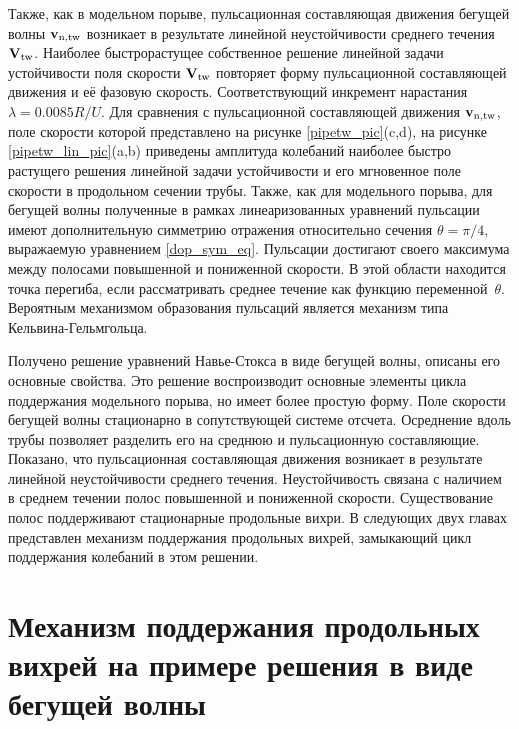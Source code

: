 Также, как в модельном порыве, пульсационная составляющая движения бегущей волны $\mathbf{v}_\mathrm{n,tw}$ возникает в результате линейной неустойчивости среднего течения $\mathbf{V}_\mathrm{tw}$. Наиболее быстрорастущее собственное решение линейной задачи устойчивости поля скорости $\mathbf{V}_\mathrm{tw}$ повторяет форму пульсационной составляющей движения и её фазовую скорость. Соответствующий инкремент нарастания $\lambda = 0.0085R/U$. Для сравнения с пульсационной составляющей движения $\mathbf{v}_\mathrm{n,tw}$, поле скорости которой представлено на рисунке \ref{pipetw_pic}(c,d), на рисунке \ref{pipetw_lin_pic}(a,b) приведены амплитуда колебаний наиболее быстро растущего решения линейной задачи устойчивости и его мгновенное поле скорости в продольном сечении трубы. Также, как для модельного порыва, для бегущей волны полученные в рамках линеаризованных уравнений пульсации имеют дополнительную симметрию отражения относительно сечения $\theta = \pi/4$, выражаемую уравнением \eqref{dop_sym_eq}. Пульсации достигают своего максимума между полосами повышенной и пониженной скорости. В этой области находится точка перегиба, если рассматривать среднее течение как функцию переменной~$\theta$. Вероятным механизмом образования пульсаций является механизм типа Кельвина-Гельмгольца.


Получено решение уравнений Навье-Стокса в виде бегущей волны, описаны его основные свойства. Это решение воспроизводит основные элементы цикла поддержания модельного порыва, но имеет более простую форму. Поле скорости бегущей волны стационарно в сопутствующей системе отсчета. Осреднение вдоль трубы позволяет разделить его на среднюю и пульсационную составляющие. Показано, что пульсационная составляющая движения возникает в результате линейной неустойчивости среднего течения. Неустойчивость связана с наличием в среднем течении полос повышенной и пониженной скорости. Существование полос поддерживают стационарные продольные вихри. В следующих двух главах представлен механизм поддержания продольных вихрей, замыкающий цикл поддержания колебаний в этом решении. 


\section{Механизм поддержания продольных вихрей на примере решения в виде бегущей волны}


